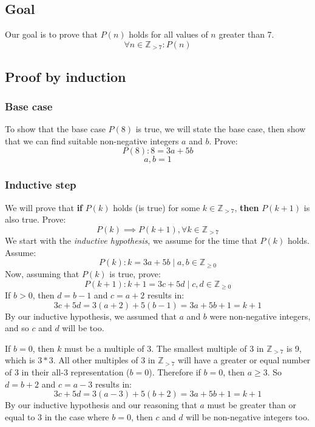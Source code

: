 \documentclass{article}
\begin{document}
\subsection{Goal}
Our goal is to prove that $P(n)$ holds for all values of $n$ greater than 7.
\begin{equation}
\forall n \in \mathbb Z_{> 7} : P(n)
\end{equation}

\subsection{Proof by induction}
\subsubsection{Base case}
To show that the base case $P(8)$ is true, we will state the base case, then show that we can find suitable non-negative integers $a$ and $b$. Prove:
\begin{equation}
P(8): 8 = 3a + 5b
\end{equation}
\[ a,b = 1 \]

\subsubsection{Inductive step}
We will prove that \textbf{if} $P(k)$ holds (is true) for some $k \in \mathbb Z_{> 7}$, \textbf{then} $P(k + 1)$ is also true. Prove:
\begin{equation}
P(k) \implies P(k + 1), \forall k \in \mathbb Z_{> 7}
\end{equation}
We start with the \textit{inductive hypothesis}, we assume for the time that $P(k)$ holds. Assume:
\begin{equation}
P(k): k = 3a + 5b \mid a,b \in \mathbb Z_{\ge 0}
\end{equation}
Now, assuming that $P(k)$ is true, prove:
\begin{equation}
P(k + 1): k + 1 = 3c + 5d \mid c,d \in \mathbb Z_{\ge 0}
\end{equation}
If $b > 0$, then $d = b - 1$ and $c = a + 2$ results in:
\[ 3c + 5d = 3(a + 2) + 5(b - 1) = 3a + 5b + 1 = k + 1 \]
By our inductive hypothesis, we assumed that $a$ and $b$ were non-negative integers, and so $c$ and $d$ will be too.

If $b = 0$, then $k$ must be a multiple of 3. The smallest multiple of 3 in $\mathbb Z_{> 7}$ is 9, which is $3 * 3$. All other multiples of 3 in $\mathbb Z_{> 7}$ will have a greater or equal number of 3 in their all-3 representation ($b = 0$). Therefore if $b = 0$, then $a \ge 3$. So $d = b + 2$ and $c = a - 3$ results in:
\[ 3c + 5d = 3(a - 3) + 5(b + 2) = 3a + 5b + 1 = k + 1 \]
By our inductive hypothesis and our reasoning that $a$ must be greater than or equal to 3 in the case where $b = 0$, then $c$ and $d$ will be non-negative integers too.
\end{document}
